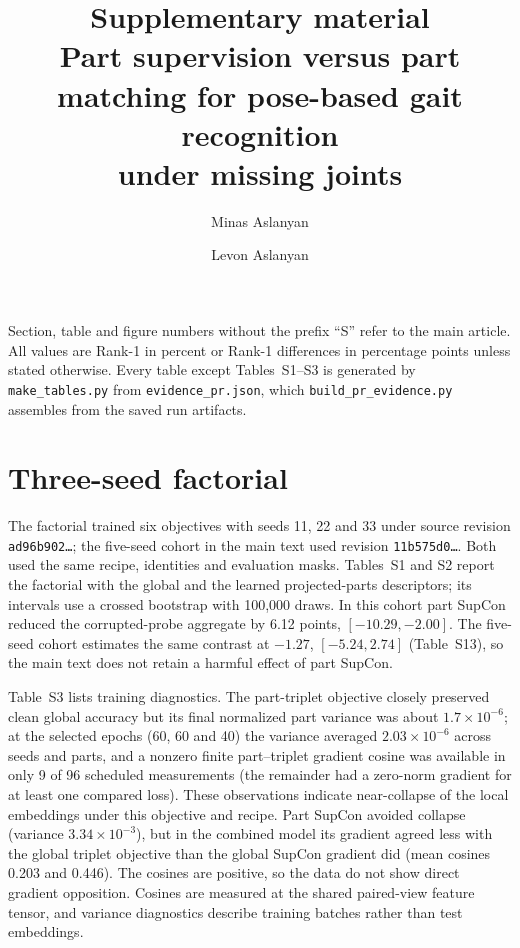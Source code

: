 \documentclass[11pt]{article}
\title{Supplementary material\\[4pt]
\large Part supervision versus part matching for pose-based gait recognition\\ under missing joints}
\author{Minas Aslanyan \and Levon Aslanyan}
\date{}
\begin{document}
\maketitle

\noindent Section, table and figure numbers without the prefix ``S'' refer to the
main article. All values are Rank-1 in percent or Rank-1 differences in
percentage points unless stated otherwise. Every table except Tables~S1--S3 is
generated by \texttt{make\_tables.py} from \texttt{evidence\_pr.json}, which
\texttt{build\_pr\_evidence.py} assembles from the saved run artifacts.

\section{Three-seed factorial}
\label{sec:s-factorial}

The factorial trained six objectives with seeds 11, 22 and 33 under source
revision \texttt{ad96b902\ldots}; the five-seed cohort in the main text used
revision \texttt{11b575d0\ldots}. Both used the same recipe, identities and
evaluation masks. Tables~S1 and S2 report the factorial with the global and the
learned projected-parts descriptors; its intervals use a crossed bootstrap with
100,000 draws. In this cohort part SupCon reduced the corrupted-probe aggregate
by 6.12 points, $[-10.29,-2.00]$. The five-seed cohort estimates the same
contrast at $-1.27$, $[-5.24,2.74]$ (Table~S13), so the main text does not
retain a harmful effect of part SupCon.

Table~S3 lists training diagnostics. The part-triplet objective closely
preserved clean global accuracy but its final normalized part variance was
about $1.7\times10^{-6}$; at the selected epochs (60, 60 and 40) the variance
averaged $2.03\times10^{-6}$ across seeds and parts, and a nonzero finite
part--triplet gradient cosine was available in only 9 of 96 scheduled
measurements (the remainder had a zero-norm gradient for at least one compared
loss). These observations indicate near-collapse of the local embeddings under
this objective and recipe. Part SupCon avoided collapse (variance
$3.34\times10^{-3}$), but in the combined model its gradient agreed less with
the global triplet objective than the global SupCon gradient did (mean cosines
0.203 and 0.446). The cosines are positive, so the data do not show direct
gradient opposition. Cosines are measured at the shared paired-view feature
tensor, and variance diagnostics describe training batches rather than test
embeddings.
\end{document}
